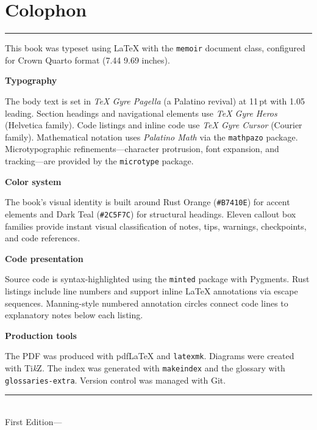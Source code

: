 \chapter*{Colophon}

\begin{center}
  {\color{brand}\rule{0.4\textwidth}{1.5pt}}
\end{center}

\vspace{12pt}

\noindent
This book was typeset using \LaTeX{} with the \texttt{memoir}
document class, configured for Crown Quarto format
(7.44\,\texttimes\,9.69 inches).

\medskip
\noindent\textbf{Typography}

\smallskip
\noindent
The body text is set in \emph{TeX Gyre Pagella} (a Palatino
revival) at 11\,pt with 1.05\texttimes{} leading. Section
headings and navigational elements use \emph{TeX Gyre Heros}
(Helvetica family). Code listings and inline code use
\emph{TeX Gyre Cursor} (Courier family). Mathematical
notation uses \emph{Palatino Math} via the \texttt{mathpazo}
package. Microtypographic refinements---character protrusion,
font expansion, and tracking---are provided by the
\texttt{microtype} package.

\medskip
\noindent\textbf{Color system}

\smallskip
\noindent
The book's visual identity is built around Rust Orange
(\texttt{\#B7410E}) for accent elements and Dark Teal
(\texttt{\#2C5F7C}) for structural headings. Eleven callout box
families provide instant visual classification of notes, tips,
warnings, checkpoints, and code references.

\medskip
\noindent\textbf{Code presentation}

\smallskip
\noindent
Source code is syntax-highlighted using the \texttt{minted}
package with Pygments. Rust listings include line numbers and
support inline \LaTeX{} annotations via escape sequences.
Manning-style numbered annotation circles connect code lines
to explanatory notes below each listing.

\medskip
\noindent\textbf{Production tools}

\smallskip
\noindent
The PDF was produced with pdf\LaTeX{} and \texttt{latexmk}.
Diagrams were created with Ti\textit{k}Z. The index was generated
with \texttt{makeindex} and the glossary with
\texttt{glossaries-extra}. Version control was managed with Git.

\vfill
\begin{center}
  {\color{brand}\rule{0.4\textwidth}{1.5pt}}\\[8pt]
  {\small\sffamily\color{sectioncolor} First Edition\enspace---\enspace\the\year}
\end{center}
